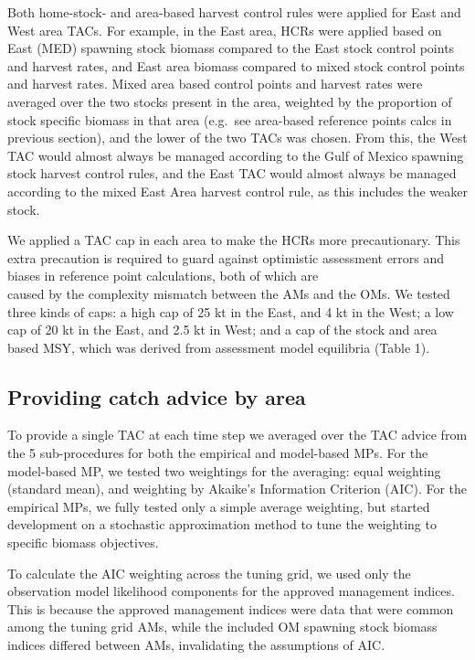 \documentclass[]{article}
\begin{document}
Both home-stock- and area-based harvest control rules were applied for
East and West area TACs. For example, in the East area, HCRs were applied
based on East (MED) spawning stock biomass compared to the East stock
control points and harvest rates, and East area biomass compared to mixed
stock control points and harvest rates. Mixed area based control points
and harvest rates were averaged over the two stocks present in the area,
weighted by the proportion of stock specific biomass in that area
(e.g.~see area-based reference points calcs in previous section), and
the lower of the two TACs was chosen. From this, the West TAC would almost
always be managed according to the Gulf of Mexico spawning stock harvest
control rules, and the East TAC would almost always be managed according
to the mixed East Area harvest control rule, as this includes the weaker
stock.

We applied a TAC cap in each area to make the HCRs more precautionary. This
extra precaution is required to guard against optimistic assessment errors
and biases in reference point calculations, both of which are\\
caused by the complexity mismatch between the AMs and the OMs. We tested
three kinds of caps: a high cap of 25 kt in the East, and 4 kt in the West;
a low cap of 20 kt in the East, and 2.5 kt in West; and a cap of the
stock and area based MSY, which was derived from assessment model
equilibria (Table 1).

\hypertarget{providing-catch-advice-by-area}{%
\subsection{Providing catch advice by area}\label{providing-catch-advice-by-area}}

To provide a single TAC at each time step we averaged over the TAC
advice from the 5 sub-procedures for both the empirical and
model-based MPs. For the model-based MP, we tested two weightings
for the averaging: equal weighting (standard mean), and weighting
by Akaike's Information Criterion (AIC). For the empirical MPs,
we fully tested only a simple average weighting, but started
development on a stochastic approximation method to tune the
weighting to specific biomass objectives.

To calculate the AIC weighting across the tuning grid, we used only
the observation model likelihood components for the approved management
indices. This is because the approved management indices were data
that were common among the tuning grid AMs, while the included OM
spawning stock biomass indices differed between AMs, invalidating
the assumptions of AIC.
\end{document}
